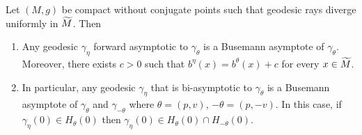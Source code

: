 \documentclass[AHL,Unicode,longabstracts,published]{cedram}
\let\oldtilde\tilde
\renewcommand*{\tilde}[1]{\mathchoice{\widetilde{#1}}{\widetilde{#1}}{\oldtilde{#1}}{\oldtilde{#1}}}
\begin{document}
\begin{lemm}\label{asymptotic-1}
Let $(M,g)$ be compact without conjugate points such that geodesic rays diverge uniformly in $\tilde{M}$. Then
\begin{enumerate}
\item \label{lemm2.10.1}Any geodesic $\gamma_{\eta}$ forward asymptotic to $\gamma_{\theta}$ is a Busemann asymptote of $\gamma_{\theta}$. Moreover, there exists $c>0$ such that $b^{\eta} (x) = b^{\theta}(x) +c$ for every $ x \in \tilde{M}$.
\item  \label{lemm2.10.2}In particular, any geodesic $\gamma_{\eta}$ that is bi-asymptotic to $\gamma_{\theta}$ is a Busemann asymptote of $\gamma_{\theta}$ and $\gamma_{-\theta}$ where $\theta = (p,v)$, $-\theta= (p,-v)$. In this case, if $\gamma_{\eta}(0) \in H_{\theta}(0)$ then $\gamma_{\eta}(0) \in H_{\theta}(0)\cap H_{-\theta}(0)$.
\end{enumerate}
\end{lemm}
\end{document}
